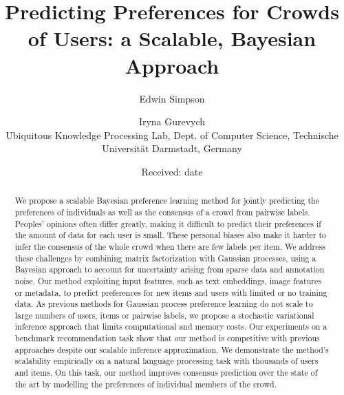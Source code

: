 \documentclass[smallcondensed,natbib]{svjour3}     %
\title{ 
Predicting Preferences for Crowds of Users: a Scalable, Bayesian Approach
}
\author{Edwin Simpson 
\and Iryna Gurevych \\
Ubiquitous Knowledge Processing Lab, Dept. of Computer Science, Technische Universit\"at Darmstadt, Germany\\
              \email{\{simpson,gurevych\}@ukp.informatik.tu-darmstadt.de}
}
\date{Received: date}
\begin{document}


\maketitle

\begin{abstract}
We propose a scalable Bayesian preference learning method 
for jointly predicting the preferences of individuals as well as the consensus of a crowd
 from pairwise labels.
Peoples' opinions often differ greatly,
making it difficult to predict their preferences if the amount of data for each user is small.
These personal biases also make it harder to infer the consensus of the whole crowd
when there are few labels per item.
We address these challenges by combining matrix factorization with 
Gaussian processes,
using a Bayesian approach to account for uncertainty arising from sparse data and annotation noise.
Our method exploiting input features, such as text embeddings, image features or metadata,
to predict preferences for new items and users with limited or no training data.
As previous methods for Gaussian process preference learning do not scale to 
large numbers of users, items or pairwise labels, 
we propose a stochastic variational inference approach that limits computational and memory costs.
Our experiments on a benchmark recommendation task show that
our method is competitive with previous approaches despite our scalable inference approximation.
We demonstrate the method's scalability empirically
on a natural language processing task with thousands of users and items.
On this task, our method improves consensus prediction over the state of the art
by modelling the preferences of individual members of the crowd.

\end{abstract}
\end{document}
